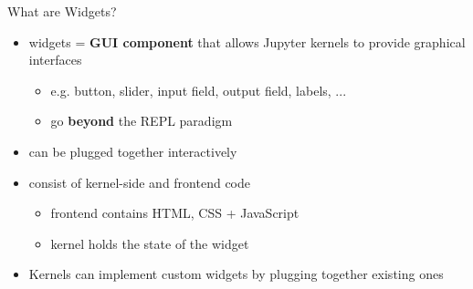 \documentclass{beamer}
\begin{document}
    \begin{frame}{What are Widgets?}
        \begin{itemize}
            \item widgets = \textbf{GUI component} that allows Jupyter kernels to provide graphical interfaces
            \begin{itemize}
                \item e.g. button, slider, input field, output field, labels, ...
                \item go \textbf{beyond} the REPL paradigm
            \end{itemize}

            \item can be plugged together interactively
            \item consist of kernel-side and frontend code
            \begin{itemize}
                \item frontend contains HTML, CSS + JavaScript
                \item kernel holds the state of the widget
            \end{itemize}
            \item Kernels can implement custom widgets by plugging together existing ones
        \end{itemize}
    \end{frame}
\end{document}
